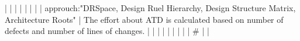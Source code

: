 |    |            |      |                                                                      |                                                                                                                                                                          |                                                                                                                                                                                                                                                            |                                                                                                                                                                                                                                                                      |  approuch:"DRSpace, Design Ruel Hierarchy, Design Structure Matrix, Architecture Roots"                                                                                                                                                                                                                  | The effort about ATD is calculated based on number of defects and number of lines of changes.                                                                                                                                                                                                                                                                                                                                                                                                |
|    |            |      |                                                                      |                                                                                                                                                                          |                                                                                                                                                                                                                                                            |                                                                                                                                                                                                                                                                      |  #                                                                                                                                                                                                                                                                                                       |                                                                                                                                                                                                                                                                                                                                                                                                                                                                                              |
